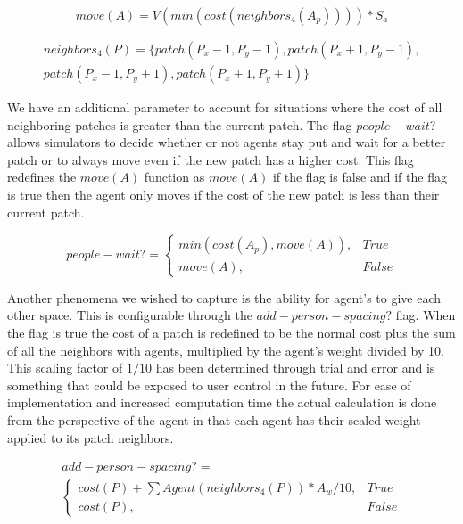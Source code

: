 \documentclass[12pt,letterpaper]{article}
\begin{document}
\begin{equation}
move(A) = V( min(cost(neighbors_4 (A_p))) ) * S_a
\end{equation}

\begin{align}
neighbors_4 (P)  = \{patch(P_x - 1, P_y -1), patch(P_x + 1, P_y -1), \nonumber \\ 
patch(P_x - 1, P_y + 1),patch(P_x + 1, P_y + 1)\}   
\end{align}


We have an additional parameter to account for situations where the cost of all neighboring patches is greater than the current patch. The flag $people-wait?$ allows simulators to decide whether or not agents stay put and wait for a better patch or to always move even if the new patch has a higher cost.  This flag redefines the $move(A)$ function as $move(A)$ if the flag is false and if the flag is true then the agent only moves if the cost of the new patch is less than their current patch.

\begin{equation}
people-wait?=
\begin{cases}
min(cost(A_p), move(A)), & True \\
move(A), & False
\end{cases}
\end{equation}

Another phenomena we wished to capture is the ability for agent's to give each other space.  This is configurable through the $add-person-spacing?$ flag.  When the flag is true the cost of a patch is redefined to be the normal cost plus the sum of all the neighbors with agents, multiplied by the agent's weight divided by 10.  This scaling factor of $1/10$ has been determined through trial and error and is something that could be exposed to user control in the future.  For ease of implementation and increased computation time the actual calculation is done from the perspective of the agent in that each agent has their scaled weight applied to its patch neighbors.

\begin{align}
add-person-spacing?= \nonumber  \\
\begin{cases}
	cost(P) + \sum Agent(neighbors_4(P)) * A_w / 10, & True \\
	cost(P), & False
\end{cases}
\label{agentWeight}
\end{align}
\end{document}
